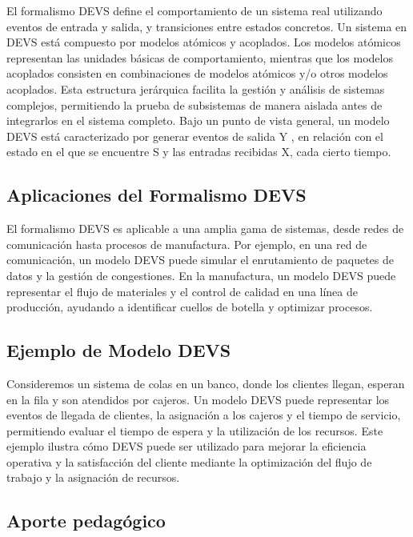 \documentclass[12pt,twoside]{templates/unerthesis}
\begin{document}
El formalismo DEVS define el comportamiento de un sistema real utilizando eventos de entrada y salida, y transiciones entre estados concretos. Un sistema en DEVS está compuesto por modelos atómicos y acoplados. Los modelos atómicos representan las unidades básicas de comportamiento, mientras que los modelos acoplados consisten en combinaciones de modelos atómicos y/o otros modelos acoplados. Esta estructura jerárquica facilita la gestión y análisis de sistemas complejos, permitiendo la prueba de subsistemas de manera aislada antes de integrarlos en el sistema completo.
Bajo un punto de vista general, un modelo DEVS está caracterizado por generar eventos de salida Y , en relación con el estado en el que se encuentre S y las entradas recibidas X, cada cierto tiempo.

\hypertarget{aplicaciones-del-formalismo-devs}{%
\subsection{Aplicaciones del Formalismo DEVS}\label{aplicaciones-del-formalismo-devs}}

El formalismo DEVS es aplicable a una amplia gama de sistemas, desde redes de comunicación hasta procesos de manufactura. Por ejemplo, en una red de comunicación, un modelo DEVS puede simular el enrutamiento de paquetes de datos y la gestión de congestiones. En la manufactura, un modelo DEVS puede representar el flujo de materiales y el control de calidad en una línea de producción, ayudando a identificar cuellos de botella y optimizar procesos.

\hypertarget{ejemplo-de-modelo-devs}{%
\subsection{Ejemplo de Modelo DEVS}\label{ejemplo-de-modelo-devs}}

Consideremos un sistema de colas en un banco, donde los clientes llegan, esperan en la fila y son atendidos por cajeros. Un modelo DEVS puede representar los eventos de llegada de clientes, la asignación a los cajeros y el tiempo de servicio, permitiendo evaluar el tiempo de espera y la utilización de los recursos. Este ejemplo ilustra cómo DEVS puede ser utilizado para mejorar la eficiencia operativa y la satisfacción del cliente mediante la optimización del flujo de trabajo y la asignación de recursos.

\hypertarget{aporte-pedaguxf3gico}{%
\subsection{Aporte pedagógico}\label{aporte-pedaguxf3gico}}
\end{document}
